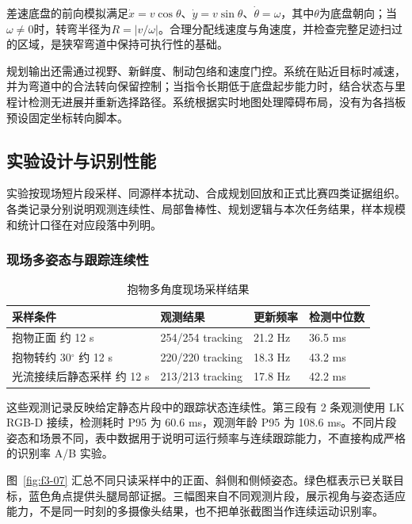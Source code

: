 差速底盘的前向模拟满足$\dot{x}=v\cos\theta$、$\dot{y}=v\sin\theta$、$\dot{\theta}=\omega$，其中$\theta$为底盘朝向；当$\omega\ne0$时，转弯半径为$R=|v/\omega|$。合理分配线速度与角速度，并检查完整足迹扫过的区域，是狭窄弯道中保持可执行性的基础。

规划输出还需通过视野、新鲜度、制动包络和速度门控。系统在贴近目标时减速，并为弯道中的合法转向保留控制；当指令长期低于底盘起步能力时，结合状态与里程计检测无进展并重新选择路径。系统根据实时地图处理障碍布局，没有为各挡板预设固定坐标转向脚本。




\FloatBarrier
{}
\subsection{实验设计与识别性能}\label{sec:f3-recognition-results}
实验按现场短片段采样、同源样本扰动、合成规划回放和正式比赛四类证据组织。各类记录分别说明观测连续性、局部鲁棒性、规划逻辑与本次任务结果，样本规模和统计口径在对应段落中列明。

\subsubsection{现场多姿态与跟踪连续性}
\begin{table}[!htbp]
\centering\small
\caption{抱物多角度现场采样结果}\label{tab:f3-sampling}
\begin{tabularx}{\linewidth}{p{.32\linewidth}YYY}\toprule
采样条件 & 观测结果 & 更新频率 & 检测中位数\\
\midrule
抱物正面  约 12 s & 254/254 tracking & 21.2 Hz & 36.5 ms\\
抱物转约 30$^{\circ}$  约 12 s & 220/220 tracking & 18.3 Hz & 43.2 ms\\
光流接续后静态采样  约 12 s & 213/213 tracking & 17.8 Hz & 42.2 ms\\
\bottomrule\end{tabularx}
\end{table}

这些观测记录反映给定静态片段中的跟踪状态连续性。第三段有 2 条观测使用 LK RGB-D 接续，检测耗时 P95 为 60.6 ms，观测年龄 P95 为 108.6 ms。不同片段姿态和场景不同，表中数据用于说明可运行频率与连续跟踪能力，不直接构成严格的识别率 A/B 实验。\cite{f3-carry,f3-opt}

图~\ref{fig:f3-07} 汇总不同只读采样中的正面、斜侧和侧倾姿态。绿色框表示已关联目标，蓝色角点提供头腿局部证据。三幅图来自不同观测片段，展示视角与姿态适应能力，不是同一时刻的多摄像头结果，也不把单张截图当作连续运动识别率。

